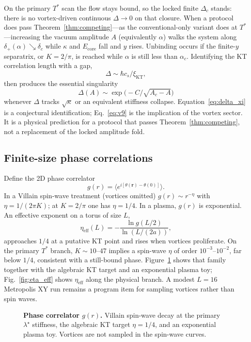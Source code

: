On the primary $T^*$ scan the flow stays bound, so the locked finite $\Delta_c$ stands: there is no vortex-driven continuous $\Delta\to 0$ on that closure. When a protocol does pass Theorem~\ref{thm:competing}---as the conventional-only variant does at $T^*$---increasing the vacuum amplitude $A$ (equivalently $\alpha$) walks the system along $\delta_+(\alpha)\searrow\delta_c$ while $\kappa$ and $E_{\mathrm{core}}$ fall and $y$ rises. Unbinding occurs if the finite-$y$ separatrix, or $K=2/\pi$, is reached while $\alpha$ is still less than $\alpha_c$. Identifying the KT correlation length with a gap,
\begin{equation}
\Delta\sim\hbar c_s/\xi_{\mathrm{KT}},
\label{eq:delta_xi}
\end{equation}
then produces the essential singularity
\begin{equation}
\Delta(A)\sim\exp\bigl(-C/\sqrt{A_c-A}\bigr)
\label{eq:v9}
\end{equation}
whenever $\Delta$ tracks $\sqrt{\kappa}$ or an equivalent stiffness collapse. Equation~\eqref{eq:delta_xi} is a conjectural identification; Eq.~\eqref{eq:v9} is the \BKT{} implication of the vortex sector. It is a physical prediction for a protocol that passes Theorem~\ref{thm:competing}, not a replacement of the locked amplitude fold.

\subsection{Finite-size phase correlations}
\label{sec:gr}

Define the 2D phase correlator
\begin{equation}
g(r)=\bigl\langle e^{i[\theta(\mathbf{r})-\theta(0)]}\bigr\rangle.
\label{eq:gr}
\end{equation}
In a Villain spin-wave treatment (vortices omitted) $g(r)\sim r^{-\eta}$ with $\eta=1/(2\pi K)$; at $K=2/\pi$ one has $\eta=1/4$. In a plasma, $g(r)$ is exponential. An effective exponent on a torus of size $L$,
\begin{equation}
\eta_{\mathrm{eff}}(L)=-\frac{\ln g(L/2)}{\ln(L/(2a))},
\label{eq:eta_eff}
\end{equation}
approaches $1/4$ at a putative KT point and rises when vortices proliferate. On the primary $T^*$ branch, $K\sim 10$--$47$ implies a spin-wave $\eta$ of order $10^{-3}$--$10^{-2}$, far below $1/4$, consistent with a still-bound phase. Figure~\ref{fig:gr} shows that family together with the algebraic KT target and an exponential plasma toy; Fig.~\ref{fig:eta_eff} shows $\eta_{\mathrm{eff}}$ along the physical branch. A modest $L=16$ Metropolis XY run remains a program item for sampling vortices rather than spin waves. 
\begin{figure}[htbp]
\centering

\caption{\textbf{Phase correlator $g(r)$.} Villain spin-wave decay at the primary $\lambda^\star$ stiffness, the algebraic KT target $\eta=1/4$, and an exponential plasma toy. Vortices are not sampled in the spin-wave curves.}
\label{fig:gr}
\end{figure}

